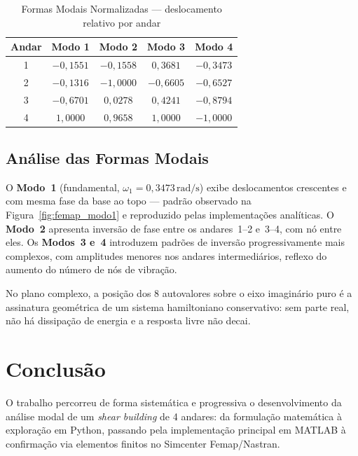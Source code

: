 \documentclass[12pt, a4paper, oneside]{article}
\numberwithin{equation}{section}
\numberwithin{figure}{section}
\numberwithin{table}{section}
\begin{document}
\begin{table}[htbp]
  \centering
  \caption{Formas Modais Normalizadas --- deslocamento relativo por andar}
  \label{tab:modos}
  \begin{tabular}{ccccc}
    \toprule
    Andar & Modo 1 & Modo 2 & Modo 3 & Modo 4 \\
    \midrule
    1 & $-0{,}1551$ & $-0{,}1558$ & $ 0{,}3681$ & $-0{,}3473$ \\
    2 & $-0{,}1316$ & $-1{,}0000$ & $-0{,}6605$ & $-0{,}6527$ \\
    3 & $-0{,}6701$ & $ 0{,}0278$ & $ 0{,}4241$ & $-0{,}8794$ \\
    4 & $ 1{,}0000$ & $ 0{,}9658$ & $ 1{,}0000$ & $-1{,}0000$ \\
    \bottomrule
  \end{tabular}
\end{table}

\subsection{Análise das Formas Modais}

O \textbf{Modo~1} (fundamental, $\omega_1 = 0{,}3473\,\text{rad/s}$) exibe
deslocamentos crescentes e com mesma fase da base ao topo --- padrão observado
na Figura~\ref{fig:femap_modo1} e reproduzido pelas implementações analíticas.
O \textbf{Modo~2} apresenta inversão de fase entre os andares~1--2 e~3--4, com
nó entre eles. Os \textbf{Modos~3 e~4} introduzem padrões de inversão
progressivamente mais complexos, com amplitudes menores nos andares
intermediários, reflexo do aumento do número de nós de vibração.

No plano complexo, a posição dos 8 autovalores sobre o eixo imaginário puro é a
assinatura geométrica de um sistema hamiltoniano conservativo: sem parte real,
não há dissipação de energia e a resposta livre não decai.

\section{Conclusão}

O trabalho percorreu de forma sistemática e progressiva o desenvolvimento da
análise modal de um \textit{shear building} de 4 andares: da formulação matemática à exploração em Python, passando pela implementação principal em MATLAB à confirmação via elementos finitos no Simcenter Femap/Nastran.
\end{document}
